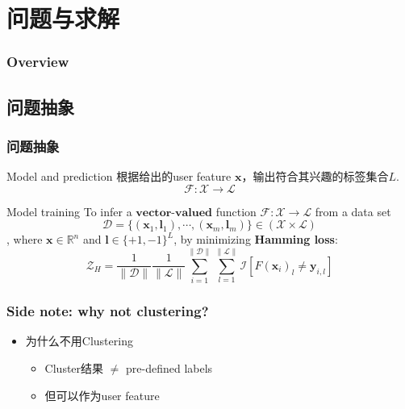 \documentclass{beamer}
\begin{document}
\section{问题与求解}

\begin{frame}
\frametitle{Overview} %
\tableofcontents[currentsection] %
\end{frame}

\subsection{问题抽象}

\begin{frame}
\frametitle{问题抽象}
\begin{block}{Model and prediction}
根据给出的user feature $\mathbf{x}$，输出符合其兴趣的标签集合$\mathit{L}$.
$$\mathcal{F} : \mathcal{X} \rightarrow \mathcal{L}$$
\end{block}

\pause

\begin{block}{Model training}
To infer a $\textbf{vector-valued}$ function $\mathcal{F} : \mathcal{X} \rightarrow \mathcal{L}$ from a data set
$$\mathcal{D} = \{({\mathbf{x}}_1, {\mathbf{l}}_1), \cdots, ({\mathbf{x}}_m, {\mathbf{l}}_m)\} \in (\mathcal{X} \times \mathcal{L})$$
, where $\mathbf{x} \in \mathbb{R}^n$ and $\mathbf{l} \in {\{+1,-1\}}^L$, by minimizing \textbf{Hamming loss}:
$$\mathcal{Z}_{H} = \frac{1}{\|\mathcal{D}\|} \frac{1}{\|\mathcal{L}\|} \sum_{i=1}^{\|\mathcal{D}\|} \sum_{l=1}^{\|\mathcal{L}\|} \mathcal{I} [ \mathit{F}(\mathbf{x}_i)_l \neq \mathbf{y}_{i,l} ]$$
\end{block}
\end{frame}

\begin{frame}
\frametitle{Side note: why not clustering?}

\begin{itemize}
\item 为什么不用Clustering
  \begin{itemize}
    \item Cluster结果 $\neq$  pre-defined labels
    \item 但可以作为user feature
  \end{itemize}
\end{itemize}
\end{frame}
\end{document}
